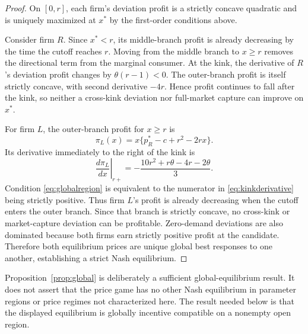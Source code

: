 \begin{proof}
On $[0,r]$, each firm's deviation profit is a strictly concave quadratic and is uniquely maximized at $x^*$ by the first-order conditions above.

Consider firm $R$. Since $x^*<r$, its middle-branch profit is already decreasing by the time the cutoff reaches $r$. Moving from the middle branch to $x\ge r$ removes the directional term from the marginal consumer. At the kink, the derivative of $R$'s deviation profit changes by $\theta(r-1)<0$. The outer-branch profit is itself strictly concave, with second derivative $-4r$. Hence profit continues to fall after the kink, so neither a cross-kink deviation nor full-market capture can improve on $x^*$.

For firm $L$, the outer-branch profit for $x\ge r$ is
\begin{equation}
\pi_L(x)=x\{p_R^*-c+r^2-2rx\}.
\end{equation}
Its derivative immediately to the right of the kink is
\begin{equation}
\left.\frac{d\pi_L}{dx}\right|_{r+}
=-\frac{10r^2+r\theta-4r-2\theta}{3}.
\label{eq:kinkderivative}
\end{equation}
Condition \eqref{eq:globalregion} is equivalent to the numerator in \eqref{eq:kinkderivative} being strictly positive. Thus firm $L$'s profit is already decreasing when the cutoff enters the outer branch. Since that branch is strictly concave, no cross-kink or market-capture deviation can be profitable. Zero-demand deviations are also dominated because both firms earn strictly positive profit at the candidate. Therefore both equilibrium prices are unique global best responses to one another, establishing a strict Nash equilibrium.
\end{proof}

Proposition~\ref{prop:global} is deliberately a sufficient global-equilibrium result. It does not assert that the price game has no other Nash equilibrium in parameter regions or price regimes not characterized here. The result needed below is that the displayed equilibrium is globally incentive compatible on a nonempty open region.